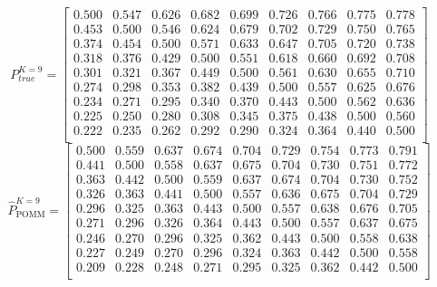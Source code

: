 \documentclass[11pt]{amsart}
\begin{document}
\[
P^{K=9}_{true} = 
\left[\begin{array}{ccccccccc}
0.500 & 0.547 & 0.626 & 0.682 & 0.699 & 0.726 & 0.766 & 0.775 & 0.778 \\
0.453 & 0.500 & 0.546 & 0.624 & 0.679 & 0.702 & 0.729 & 0.750 & 0.765 \\
0.374 & 0.454 & 0.500 & 0.571 & 0.633 & 0.647 & 0.705 & 0.720 & 0.738 \\
0.318 & 0.376 & 0.429 & 0.500 & 0.551 & 0.618 & 0.660 & 0.692 & 0.708 \\
0.301 & 0.321 & 0.367 & 0.449 & 0.500 & 0.561 & 0.630 & 0.655 & 0.710 \\
0.274 & 0.298 & 0.353 & 0.382 & 0.439 & 0.500 & 0.557 & 0.625 & 0.676 \\
0.234 & 0.271 & 0.295 & 0.340 & 0.370 & 0.443 & 0.500 & 0.562 & 0.636 \\
0.225 & 0.250 & 0.280 & 0.308 & 0.345 & 0.375 & 0.438 & 0.500 & 0.560 \\
0.222 & 0.235 & 0.262 & 0.292 & 0.290 & 0.324 & 0.364 & 0.440 & 0.500 \\
\end{array}\right] 
\]
\[ 
\hat{P}^{K=9}_{\text{POMM}} = 
\left[\begin{array}{ccccccccc}
0.500 & 0.559 & 0.637 & 0.674 & 0.704 & 0.729 & 0.754 & 0.773 & 0.791 \\
0.441 & 0.500 & 0.558 & 0.637 & 0.675 & 0.704 & 0.730 & 0.751 & 0.772 \\
0.363 & 0.442 & 0.500 & 0.559 & 0.637 & 0.674 & 0.704 & 0.730 & 0.752 \\
0.326 & 0.363 & 0.441 & 0.500 & 0.557 & 0.636 & 0.675 & 0.704 & 0.729 \\
0.296 & 0.325 & 0.363 & 0.443 & 0.500 & 0.557 & 0.638 & 0.676 & 0.705 \\
0.271 & 0.296 & 0.326 & 0.364 & 0.443 & 0.500 & 0.557 & 0.637 & 0.675 \\
0.246 & 0.270 & 0.296 & 0.325 & 0.362 & 0.443 & 0.500 & 0.558 & 0.638 \\
0.227 & 0.249 & 0.270 & 0.296 & 0.324 & 0.363 & 0.442 & 0.500 & 0.558 \\
0.209 & 0.228 & 0.248 & 0.271 & 0.295 & 0.325 & 0.362 & 0.442 & 0.500 \\
\end{array}\right] 
\]
\end{document}
